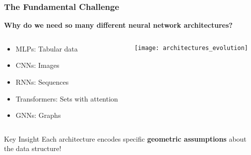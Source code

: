 \begin{frame}[fragile]\frametitle{The Fundamental Challenge}

\begin{center}
\textbf{Why do we need so many different neural network architectures?}
\end{center}

\begin{columns}
\begin{column}{0.5\textwidth}
\begin{itemize}
\item MLPs: Tabular data
\item CNNs: Images 
\item RNNs: Sequences
\item Transformers: Sets with attention
\item GNNs: Graphs
\end{itemize}
\end{column}
\begin{column}{0.5\textwidth}
\begin{center}
\texttt{[image: architectures\_evolution]}
\end{center}
\end{column}
\end{columns}

\vspace{0.5cm}
\begin{alertblock}{Key Insight}
Each architecture encodes specific \textbf{geometric assumptions} about the data structure!
\end{alertblock}

\end{frame}

